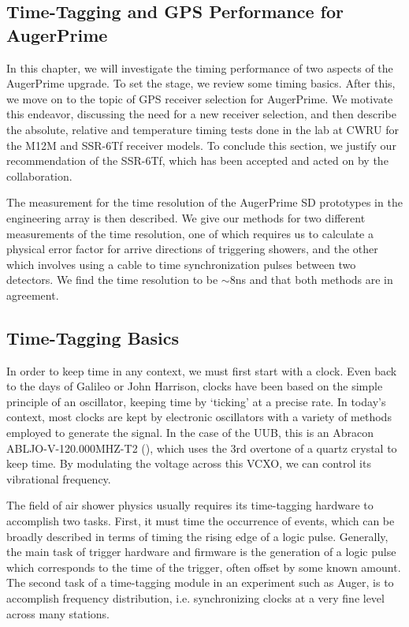 \begin{singlespace}
\chapter{Time-Tagging and GPS Performance for AugerPrime}
\end{singlespace}
\label{augtiming}
In this chapter, we will investigate the timing performance of two aspects of the AugerPrime upgrade. To set the stage, we review some timing basics. After this, we move on to the topic of GPS receiver selection for AugerPrime. We motivate this endeavor, discussing the need for a new receiver selection, and then describe the absolute, relative and temperature timing tests done in the lab at CWRU for the M12M and SSR-6Tf receiver models. To conclude this section, we justify our recommendation of the SSR-6Tf, which has been accepted and acted on by the collaboration. 

The measurement for the time resolution of the AugerPrime SD prototypes in the engineering array is then described. We give our methods for two different measurements of the time resolution, one of which requires us to calculate a physical error factor for arrive directions of triggering showers, and the other which involves using a cable to time synchronization pulses between two detectors. We find the time resolution to be $\sim$8ns and that both methods are in agreement. 
\section{Time-Tagging Basics}
In order to keep time in any context, we must first start with a clock. Even back to the days of Galileo or John Harrison, clocks have been based on the simple principle of an oscillator, keeping time by `ticking' at a precise rate. In today's context, most clocks are kept by electronic oscillators with a variety of methods employed to generate the signal. In the case of the UUB, this is an Abracon ABLJO-V-120.000MHZ-T2 (\cite{vcxo}), which uses the 3rd overtone of a quartz crystal to keep time. By modulating the voltage across this VCXO, we can control its vibrational frequency. 

The field of air shower physics usually requires its time-tagging hardware to accomplish two tasks. First, it must time the occurrence of events, which can be broadly described in terms of timing the rising edge of a logic pulse. Generally, the main task of trigger hardware and firmware is the generation of a logic pulse which corresponds to the time of the trigger, often offset by some known amount. The second task of a time-tagging module in an experiment such as Auger, is to accomplish frequency distribution, i.e. synchronizing clocks at a very fine level across many stations.

